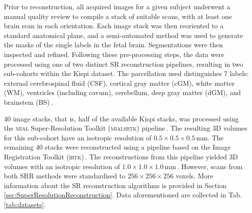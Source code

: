 Prior to reconstruction, all acquired images for a given subject underwent a manual quality review to compile a stack of suitable scans, with at least one brain scan in each orientation. Each image stack was then reoriented to a standard anatomical plane, and a semi-automated method was used to generate the masks of the single labels in the fetal brain. Segmentations were then inspected and refined. Following these pre-processing steps, the data were processed using one of two distinct SR reconstruction pipelines, resulting in two sub-cohorts within the Kispi dataset. The parcellation used distinguishes 7 labels: external cerebrospinal fluid (CSF), cortical gray matter (cGM), white matter (WM), ventricles (including cavum), cerebellum, deep gray matter (dGM), and brainstem (BS)\,\cite{FeTA2024_paper}.

40 image stacks, that is, half of the available Kispi stacks, was processed using the \textsc{mial} Super-Resolution Toolkit (\textsc{mialsrtk}) pipeline\,\cite{Tourbier2015, MIALSRTK}. The resulting 3D volumes for this sub-cohort have an isotropic resolution of $0.5 \times 0.5 \times 0.5$\,mm. The remaining 40 stacks were reconstructed using a pipeline based on the Image Registration Toolkit (\textsc{irtk})\,\cite{Kuklisova2012, irtk-simple}. The reconstructions from this pipeline yielded 3D volumes with an isotropic resolution of $1.0 \times 1.0 \times 1.0$\,mm\,\cite{FeTA2024_review}. However, scans from both SRR methods were standardised to $256 \times 256 \times 256$ voxels. More information about the SR reconstruction algorithms is provided in Section \ref{sec:SuperResolutionReconstruction}. Data aforementioned are collected in Tab.\,\ref{tab:datasets}.

